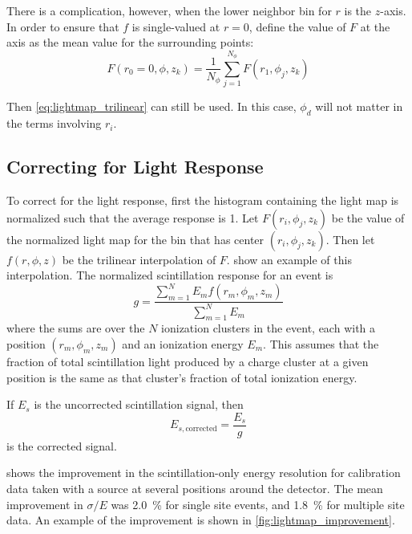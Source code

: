 \documentclass[herrin-thesis.tex]{subfiles}
\begin{document}
There is a complication, however, when the lower neighbor bin for \(r\) is the \(z\)-axis. In order to ensure that \(f\) is single-valued at \(r=0\), define the value of \(F\) at the axis as the mean value for the surrounding points: 
\begin{equation}
F(r_{0}=0, \phi, z_k) = \frac{1}{N_\phi}\sum_{j=1}^{N_\phi} F(r_{1}, \phi_j, z_k)
\end{equation}

Then \cref{eq:lightmap_trilinear} can still be used. In this case, \(\phi_d\) will not matter in the terms involving \(r_i\).

\subsection{Correcting for Light Response}

To correct for the light response, first the histogram containing the light map is normalized such that the average response is 1. Let \(F(r_i, \phi_j, z_k)\) be the value of the normalized light map for the bin that has center \((r_i, \phi_j, z_k)\). Then let \(f(r,\phi,z)\) be the trilinear interpolation of \(F\).  show an example of this interpolation. The normalized scintillation response for an event is
\begin{equation}
g = \frac{\sum_{m=1}^{N}E_m f(r_m, \phi_m, z_m)}{\sum_{m=1}^{N}E_m}
\label{eq:lightmap_weighted_response}
\end{equation}
where the sums are over the \(N\) ionization clusters in the event, each with a position \((r_m, \phi_m, z_m)\) and an ionization energy \(E_m\). This assumes that the fraction of total scintillation light produced by a charge cluster at a given position is the same as that cluster's fraction of total ionization energy.

If \(E_{s}\) is the uncorrected scintillation signal, then
\begin{equation}
E_{s,\text{corrected}} = \frac{E_s}{g}
\label{eq:lightmap_corrected_signal}
\end{equation}
is the corrected signal.

 shows the improvement in the scintillation-only energy resolution for calibration data taken with a  source at several positions around the detector. The mean improvement in \(\sigma/E\) was \SI{2.0}{\percent} for single site events, and \SI{1.8}{\percent} for multiple site data. An example of the improvement is shown in \cref{fig:lightmap_improvement}.
\end{document}
